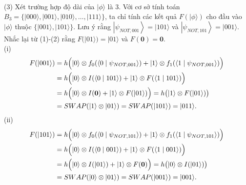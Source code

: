 \documentclass[10pt]{article}
\begin{document}
(3) Xét trường hợp độ dài của $|\phi\rangle$ là 3. Với cơ sở tính toán $B_{3}= \{|000\rangle,|001\rangle,|010\rangle, \ldots,|111\rangle\}$, ta chỉ tính các kết quả $F(|\phi\rangle)$ cho đầu vào $|\phi\rangle$ thuộc $\{|001\rangle,|101\rangle\}$. Lưu ý rằng $\left|\psi_{N O T, 001}\right\rangle=|101\rangle$ và $\left|\psi_{N O T, 101}\right\rangle=|001\rangle$. Nhắc lại từ (1)-(2) rằng $F(|01\rangle)=|01\rangle$ và $F(\mathbf{0})=\mathbf{0}$.\\
(i)
\[
\begin{aligned}
F(|001\rangle)
&= h\Bigl(|0\rangle \otimes f_{0}(\langle 0 \mid \psi_{N O T, 001}\rangle)
  + |1\rangle \otimes f_{1}(\langle 1 \mid \psi_{N O T, 001}\rangle)\Bigr) \\
&= h\Bigl(|0\rangle \otimes I(\langle 0 \mid 101\rangle)
  + |1\rangle \otimes F(\langle 1 \mid 101\rangle)\Bigr) \\
&= h\Bigl(|0\rangle \otimes I(\mathbf{0}) + |1\rangle \otimes F(|01\rangle)\Bigr)
 = h\bigl(|1\rangle \otimes F(|01\rangle)\bigr) \\
&= S W A P(|1\rangle \otimes |01\rangle)=S W A P(|101\rangle)=|011\rangle.
\end{aligned}
\]
(ii)
\[
\begin{aligned}
F(|101\rangle)
&= h\Bigl(|0\rangle \otimes f_{0}(\langle 0 \mid \psi_{N O T, 101}\rangle)
  + |1\rangle \otimes f_{1}(\langle 1 \mid \psi_{N O T, 101}\rangle)\Bigr) \\
&= h\Bigl(|0\rangle \otimes I(\langle 0 \mid 001\rangle)
  + |1\rangle \otimes F(\langle 1 \mid 001\rangle)\Bigr) \\
&= h\Bigl(|0\rangle \otimes I(|01\rangle) + |1\rangle \otimes F(\mathbf{0})\Bigr)
 = h\bigl(|0\rangle \otimes I(|01\rangle)\bigr) \\
&= S W A P(|0\rangle \otimes |01\rangle)=S W A P(|001\rangle)=|001\rangle.
\end{aligned}
\]
\end{document}
